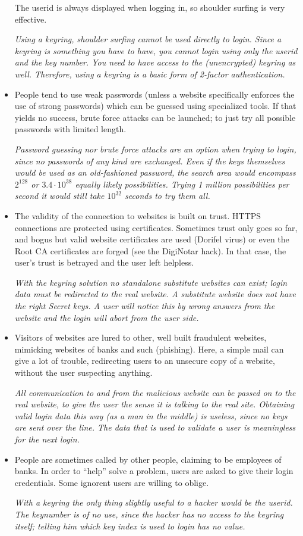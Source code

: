 \begin{itemize}
The userid is always displayed when logging in, so shoulder surfing is very effective.
\par
\emph{Using a keyring, shoulder surfing cannot be used directly to login.
Since a keyring is something you have to have, you cannot login using only the userid and the key number.
You need to have access to the (unencrypted) keyring as well.
Therefore, using a keyring is a basic form of 2-factor authentication.}
\item People tend to use weak passwords (unless a website specifically enforces the use of strong passwords) which can be guessed using specialized tools.
If that yields no success, brute force attacks can be launched; to just try all possible passwords with limited length.
\par
\emph{Password guessing nor brute force attacks are an option when trying to login, since no passwords of any kind are exchanged.
Even if the keys themselves would be used as an old-fashioned password, the search area would encompass $2^{128}$ or $3.4\cdot 10^{38}$ equally likely possibilities.
Trying 1 million possibilities per second it would still take $10^{32}$ seconds to try them all.}
\item The validity of the connection to websites is built on trust.
HTTPS connections are protected using certificates.
Sometimes trust only goes so far, and bogus but valid website certificates are used (Dorifel virus) or even the Root CA certificates are forged (see the DigiNotar hack).
In that case, the user's trust is betrayed and the user left helpless.
\par
\emph{With the keyring solution no standalone substitute websites can exist; login data must be redirected to the real website.
A substitute website does not have the right Secret keys.
A user will notice this by wrong answers from the website and the login will abort from the user side.}
\item Visitors of websites are lured to other, well built fraudulent websites, mimicking websites of banks and such (phishing).
Here, a simple mail can give a lot of trouble, redirecting users to an unsecure copy of a website, without the user suspecting anything.
\par
\emph{All communication to and from the malicious website can be passed on to the real website, to give the user the sense it is talking to the real site.
Obtaining valid login data this way (as a man in the middle) is useless, since no keys are sent over the line.
The data that is used to validate a user is meaningless for the next login.}
\item People are sometimes called by other people, claiming to be employees of banks.
In order to ``help'' solve a problem, users are asked to give their login credentials.
Some ignorent users are willing to oblige.
\par
\emph{With a keyring the only thing slightly useful to a hacker would be the userid.
The keynumber is of no use,
since the hacker has no access to the keyring itself;
telling him which key index is used to login has no value.}
\end{itemize}

